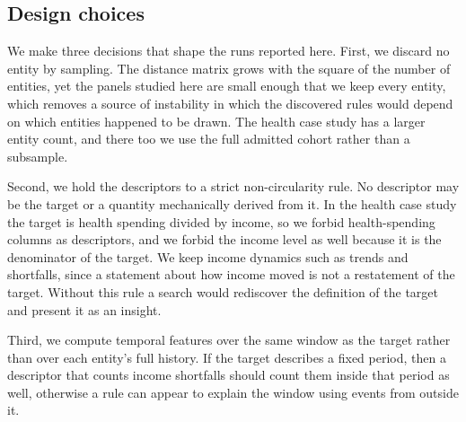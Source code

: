 \subsection{Design choices}
\label{sec:design}

We make three decisions that shape the runs reported here. First, we discard no entity by sampling. The distance matrix grows with the square of the number of entities, yet the panels studied here are small enough that we keep every entity, which removes a source of instability in which the discovered rules would depend on which entities happened to be drawn. The health case study has a larger entity count, and there too we use the full admitted cohort rather than a subsample.

Second, we hold the descriptors to a strict non-circularity rule. No descriptor may be the target or a quantity mechanically derived from it. In the health case study the target is health spending divided by income, so we forbid health-spending columns as descriptors, and we forbid the income level as well because it is the denominator of the target. We keep income dynamics such as trends and shortfalls, since a statement about how income moved is not a restatement of the target. Without this rule a search would rediscover the definition of the target and present it as an insight.

Third, we compute temporal features over the same window as the target rather than over each entity's full history. If the target describes a fixed period, then a descriptor that counts income shortfalls should count them inside that period as well, otherwise a rule can appear to explain the window using events from outside it.
